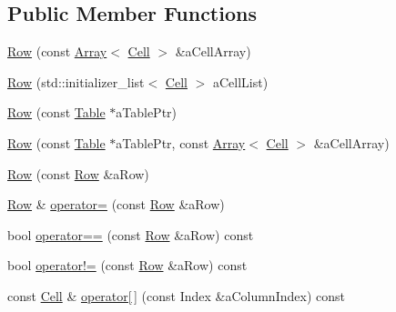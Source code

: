 \subsection*{Public Member Functions}
\begin{DoxyCompactItemize}
\item 
\hyperlink{classlibrary_1_1core_1_1ctnr_1_1table_1_1_row_adec68d43f21630c441416acc5d78d355}{Row} (const \hyperlink{classlibrary_1_1core_1_1ctnr_1_1_array}{Array}$<$ \hyperlink{namespacelibrary_1_1core_1_1ctnr_1_1table_aac6007d595b2967513e8e6b89f6092f5}{Cell} $>$ \&a\+Cell\+Array)
\item 
\hyperlink{classlibrary_1_1core_1_1ctnr_1_1table_1_1_row_ae152205e7e611a0940aa1904584302f1}{Row} (std\+::initializer\+\_\+list$<$ \hyperlink{namespacelibrary_1_1core_1_1ctnr_1_1table_aac6007d595b2967513e8e6b89f6092f5}{Cell} $>$ a\+Cell\+List)
\item 
\hyperlink{classlibrary_1_1core_1_1ctnr_1_1table_1_1_row_aa2806926a212b8b010f48c9036ab7f54}{Row} (const \hyperlink{classlibrary_1_1core_1_1ctnr_1_1_table}{Table} $\ast$a\+Table\+Ptr)
\item 
\hyperlink{classlibrary_1_1core_1_1ctnr_1_1table_1_1_row_a5fdac640867ecc76f6c3dbf1bc043ef7}{Row} (const \hyperlink{classlibrary_1_1core_1_1ctnr_1_1_table}{Table} $\ast$a\+Table\+Ptr, const \hyperlink{classlibrary_1_1core_1_1ctnr_1_1_array}{Array}$<$ \hyperlink{namespacelibrary_1_1core_1_1ctnr_1_1table_aac6007d595b2967513e8e6b89f6092f5}{Cell} $>$ \&a\+Cell\+Array)
\item 
\hyperlink{classlibrary_1_1core_1_1ctnr_1_1table_1_1_row_aeed7c04310cf0bfa9b6448d623ab84c2}{Row} (const \hyperlink{classlibrary_1_1core_1_1ctnr_1_1table_1_1_row}{Row} \&a\+Row)
\item 
\hyperlink{classlibrary_1_1core_1_1ctnr_1_1table_1_1_row}{Row} \& \hyperlink{classlibrary_1_1core_1_1ctnr_1_1table_1_1_row_a6d6582a7ac4eba2bb7d6d34b1fa79b51}{operator=} (const \hyperlink{classlibrary_1_1core_1_1ctnr_1_1table_1_1_row}{Row} \&a\+Row)
\item 
bool \hyperlink{classlibrary_1_1core_1_1ctnr_1_1table_1_1_row_a0c4f807d7c22544609314c366a494ed8}{operator==} (const \hyperlink{classlibrary_1_1core_1_1ctnr_1_1table_1_1_row}{Row} \&a\+Row) const
\item 
bool \hyperlink{classlibrary_1_1core_1_1ctnr_1_1table_1_1_row_a2c7d630e88809a564300b3c61c5124c6}{operator!=} (const \hyperlink{classlibrary_1_1core_1_1ctnr_1_1table_1_1_row}{Row} \&a\+Row) const
\item 
const \hyperlink{namespacelibrary_1_1core_1_1ctnr_1_1table_aac6007d595b2967513e8e6b89f6092f5}{Cell} \& \hyperlink{classlibrary_1_1core_1_1ctnr_1_1table_1_1_row_a8fd76f9562104b7d92b91a8774609e6f}{operator\mbox{[}$\,$\mbox{]}} (const Index \&a\+Column\+Index) const

\end{DoxyCompactItemize}
